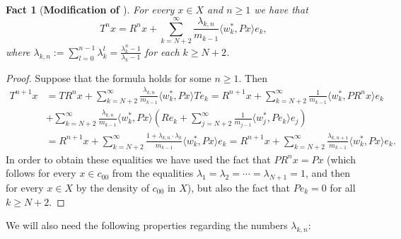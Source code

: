 \documentclass[openright,11pt]{article}
\theoremstyle{plain}
\newtheorem{fact}{Fact}[subsection]
\theoremstyle{definition}
\newcommand{\ep}[2]{\langle #1 , #2 \rangle}
\begin{document}
\begin{fact}[\textbf{Modification of \cite[Lemma 3.5]{Auge2012}}]\label{Fact:T.power.n}
	For every $x \in X$ and $n\geq 1$ we have that
	\[
	T^nx = R^nx + \sum_{k=N+2}^{\infty} \frac{\lambda_{k,n}}{m_{k-1}} \ep{w_k^*}{Px} e_k,
	\]
	where $\lambda_{k,n} := \sum_{l=0}^{n-1} \lambda_k^l = \frac{\lambda_k^n-1}{\lambda_k-1}$ for each $k \geq N+2$.
\end{fact}
\begin{proof}
	Suppose that the formula holds for some $n\geq 1$. Then
	\begin{align*}
		T^{n+1}x &= TR^nx + \sum_{k=N+2}^{\infty} \frac{\lambda_{k,n}}{m_{k-1}} \ep{w_k^*}{Px} Te_k = R^{n+1}x + \sum_{k=N+2}^{\infty} \frac{1}{m_{k-1}} \ep{w_k^*}{PR^nx} e_k \\[12pt]
		&+ \sum_{k=N+2}^{\infty} \frac{\lambda_{k,n}}{m_{k-1}} \ep{w_k^*}{Px} \left(Re_k + \sum_{j=N+2}^{\infty} \frac{1}{m_{j-1}} \ep{w_j^*}{Pe_k}e_j\right) \\[12pt]
		&= R^{n+1}x + \sum_{k=N+2}^{\infty} \frac{1 + \lambda_{k,n} \cdot \lambda_k}{m_{k-1}} \ep{w_k^*}{Px} e_k = R^{n+1}x + \sum_{k=N+2}^{\infty} \frac{\lambda_{k,n+1}}{m_{k-1}} \ep{w_k^*}{Px} e_k.
	\end{align*}
	In order to obtain these equalities we have used the fact that $PR^nx = Px$ (which follows for every $x \in c_{00}$ from the equalities $\lambda_1 = \lambda_2 = \cdots = \lambda_{N+1} = 1$, and then for every $x \in X$ by the density of $c_{00}$ in $X$), but also the fact that $Pe_k=0$ for all $k\geq N+2$.
\end{proof}

We will also need the following properties regarding the numbers $\lambda_{k,n}$:
\end{document}
